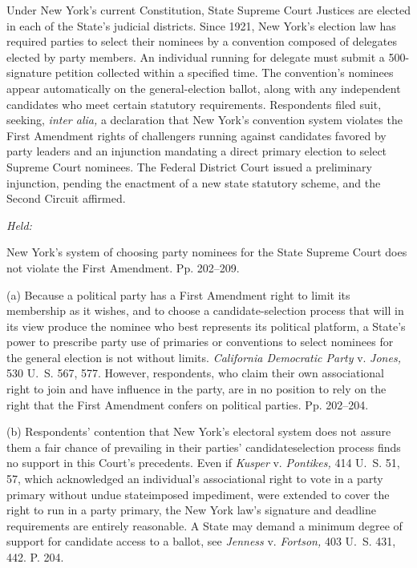 
\setcounter{page}{196}

  Under New York's current Constitution, State Supreme Court Justices are elected in each of the State's judicial districts. Since 1921, New York's election law has required parties to select their nominees by a convention composed of delegates elected by party members. An individual running for delegate must submit a 500-signature petition collected within a specified time. The convention's nominees appear automatically on the general-election ballot, along with any independent candidates who meet certain statutory requirements. Respondents filed suit, seeking, \emph{inter alia,} a declaration that New York's convention system violates the First Amendment rights of challengers running against candidates favored by party leaders and an injunction mandating a direct primary election to select Supreme Court nominees. The Federal District Court issued a preliminary injunction, pending the enactment of a new state statutory scheme, and the Second Circuit affirmed.

\emph{Held:}

\noindent New York's system of choosing party nominees for the State Supreme Court does not violate the First Amendment. Pp. 202--209.

  (a) Because a political party has a First Amendment right to limit its membership as it wishes, and to choose a candidate-selection process that will in its view produce the nominee who best represents its political platform, a State's power to prescribe party use of primaries or conventions to select nominees for the general election is not without limits. \emph{California Democratic Party} v. \emph{Jones,} 530 U.~S. 567, 577. However, respondents, who claim their own associational right to join and have influence in the party, are in no position to rely on the right that the First Amendment confers on political parties. Pp. 202--204.

  (b) Respondents' contention that New York's electoral system does not assure them a fair chance of prevailing in their parties' candidateselection process finds no support in this Court's precedents. Even if \emph{Kusper} v. \emph{Pontikes,} 414 U.~S. 51, 57, which acknowledged an individual's associational right to vote in a party primary without undue stateimposed impediment, were extended to cover the right to run in a party primary, the New York law's signature and deadline requirements are entirely reasonable. A State may demand a minimum degree of sup\newpage port for candidate access to a ballot, see \emph{Jenness} v. \emph{Fortson,} 403 U.~S. 431, 442. P. 204.

